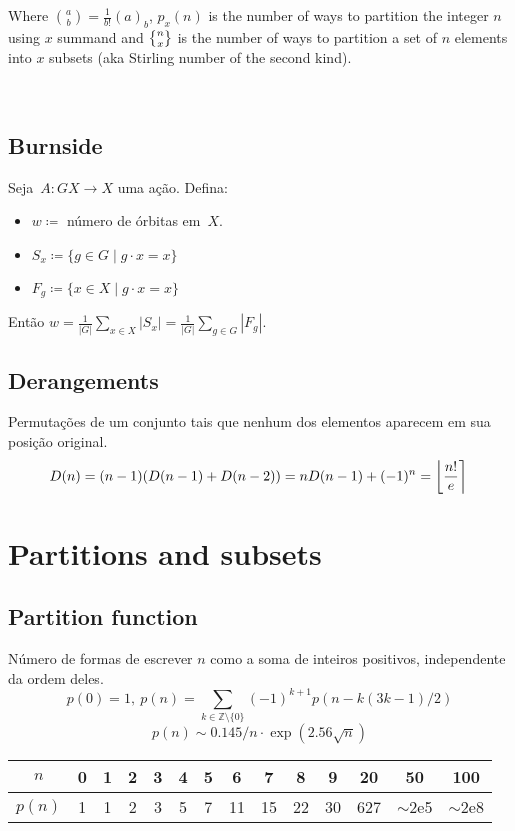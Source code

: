       Where $\binom{a}{b} = \frac{1}{b!}(a)_b $, $p_x(n)$ is the number of ways to partition the integer $n$ using $x$ summand and $\stirlingsecond{n}{x}$ is the number of ways to partition a set of $n$ elements into $x$ subsets (aka Stirling number of the second kind).


\

	
\subsection{Burnside}
Seja~$A \colon GX \rightarrow X$ uma ação. Defina:
\begin{itemize}
\item $w \coloneqq $ número de órbitas em~$X$.
\item $S_x \coloneqq \{g \in G \mid g \cdot x = x \}$
\item $F_g \coloneqq \{x \in X \mid g \cdot x = x \} $
\end{itemize}
Então $ w = \frac{1}{|G|} \sum\limits_{x \in X}{|S_x|} = \frac{1}{|G|} \sum\limits_{g \in G}{|F_g|}. $


\subsection{Derangements}
		Permutações de um conjunto tais que nenhum dos elementos aparecem em sua posição original.
		\small
		\[ \mkern-2mu D(n) = (n-1)(D(n-1)+D(n-2)) = n D(n-1)+(-1)^n = \left\lfloor\frac{n!}{e}\right\rceil \]
		\normalsize

\section{Partitions and subsets}
	\subsection{Partition function}
		Número de formas de escrever $n$ como a soma de inteiros positivos, independente da ordem deles.
		\small
		\[ p(0) = 1,\ p(n) = \sum_{k \in \mathbb Z \setminus \{0\}}{(-1)^{k+1} p(n - k(3k-1) / 2)} \]
		\[ p(n) \sim 0.145 / n \cdot \exp(2.56 \sqrt{n}) \]

		\begin{center}
		\begin{tabular}{c|c@{\ }c@{\ }c@{\ }c@{\ }c@{\ }c@{\ }c@{\ }c@{\ }c@{\ }c@{\ }c@{\ }c@{\ }c}
			$n$    & 0 & 1 & 2 & 3 & 4 & 5 & 6  & 7  & 8  & 9  & 20  & 50  & 100 \\ \hline
			$p(n)$ & 1 & 1 & 2 & 3 & 5 & 7 & 11 & 15 & 22 & 30 & 627 & $\mathtt{\sim}$2e5 & $\mathtt{\sim}$2e8 \\
		\end{tabular}
		\end{center}
		\normalsize
    
